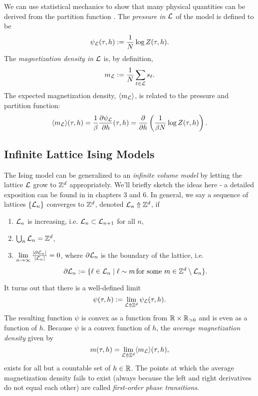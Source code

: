 \documentclass[11pt,reqno]{amsart}
\numberwithin{equation}{section}
\begin{document}
	We can use statistical mechanics to show that many physical quantities can be derived from the partition function \cite[Ch. 3]{friedli_velenik_2017}.
	The \emph{pressure in $\mathcal{L}$} of the model is defined to be 
	\[\psi_{\mathcal{L}}(\tau,h):=\frac{1}{N} \log Z(\tau,h).  \]
	The \emph{magnetization density in $\mathcal{L}$} is, by definition,
	\[ m_{\mathcal{L}}:=\frac{1}{N}\sum_{\ell \in \mathcal{L}} s_\ell. \]
	The expected magnetization density, $\langle m_{\mathcal{L}} \rangle$, is related to the pressure and partition function:
	\[\langle m_{\mathcal{L}} \rangle (\tau,h) = \frac{1}{\beta}\frac{\partial \psi_{\mathcal{L}}}{\partial h}(\tau, h)=\frac{\partial}{\partial h}\left( \frac{1}{\beta N} \log Z(\tau,h)\right) . \]
	
	
	\subsection{Infinite Lattice Ising Models}
	
	The Ising model can be generalized to an \emph{infinite volume model} by letting the lattice $\mathcal{L}$ grow to $\mathbb{Z}^d$ appropriately. 
	We'll briefly sketch the ideas here - a detailed exposition can be found in \cite{friedli_velenik_2017} in chapters 3 and 6.
	In general, we say a sequence of lattices $\{\mathcal{L}_n \}$ converges to $\mathbb{Z}^d$, denoted $\mathcal{L}_n \Uparrow \mathbb{Z}^d$, if 
	\begin{enumerate}
		\item $\mathcal{L}_n$ is increasing, i.e. $\mathcal{L}_n \subset \mathcal{L}_{n+1}$ for all $n$,
		\item $\bigcup_{n} \mathcal{L}_n = \mathbb{Z}^d$,
		\item $\lim\limits_{n\to \infty} \frac{|\partial \mathcal{L}_n|}{|\mathcal{L}_n|}=0$, where $\partial \mathcal{L}_n$ is the boundary of the lattice, i.e. 
		\[\partial \mathcal{L}_n := \{\ell \in \mathcal{L}_n \mid \ell \sim m \, \text{for some $m$}\in \mathbb{Z}^d \setminus \mathcal{L}_n \}. \]
	\end{enumerate}
	It turns out that there is a well-defined limit 
		\[\psi(\tau,h):= \lim\limits_{\mathcal{L} \Uparrow \mathbb{Z}^d} \psi_{\mathcal{L}}(\tau,h).\]
	The resulting function $\psi$ is convex as a function from $\mathbb{R} \times \mathbb{R}_{>0}$ and is even as a function of $h$.
	Because $\psi$ is a convex function of $h$, the \emph{average magnetization density} given by
		\[m(\tau,h)=\lim_{\mathcal{L} \Uparrow \mathbb{Z}^d} \langle m_{\mathcal{L}} \rangle (\tau, h), \]
	exists for all but a countable set of $h \in \mathbb{R}$.
	The points at which the average magnetization density fails to exist (always because the left and right derivatives do not equal each other) are called \emph{first-order phase transitions}.
		
\end{document}
